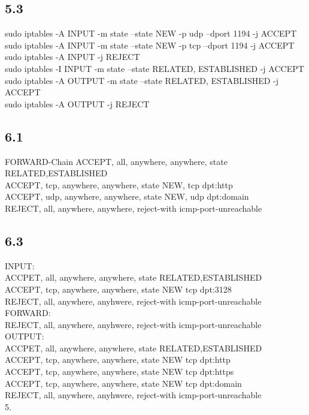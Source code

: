\documentclass[12pt]{article}
\theoremstyle{plain}
\begin{document}
\subsection*{5.3}
sudo iptables -A INPUT -m state --state NEW -p udp --dport 1194 -j ACCEPT\\
sudo iptables -A INPUT -m state --state NEW -p tcp --dport 1194 -j ACCEPT\\
sudo iptables -A INPUT -j REJECT\\
sudo iptables -I INPUT -m state --state RELATED, ESTABLISHED -j ACCEPT\\
sudo iptables -A OUTPUT -m state --state RELATED, ESTABLISHED -j ACCEPT\\
sudo iptables -A OUTPUT -j REJECT\\
\subsection*{6.1}
FORWARD-Chain
ACCEPT, all, anywhere, anywhere, state RELATED,ESTABLISHED\\
ACCEPT, tcp, anywhere, anywhere, state NEW, tcp dpt:http\\
ACCEPT, udp, anywhere, anywhere, state NEW, udp dpt:domain\\
REJECT, all, anywhere, anywhere, reject-with icmp-port-unreachable\\
\subsection*{6.3}
INPUT:\\
ACCPET, all, anywhere, anywhere, state RELATED,ESTABLISHED\\
ACCEPT, tcp, anywhere, anywhere, state NEW tcp dpt:3128\\
REJECT, all, anywhere, anyhwere, reject-with icmp-port-unreachable\\
FORWARD:\\
REJECT, all, anywhere, anyhwere, reject-with icmp-port-unreachable\\
OUTPUT:\\
ACCPET, all, anywhere, anywhere, state RELATED,ESTABLISHED\\
ACCEPT, tcp, anywhere, anywhere, state NEW tcp dpt:http\\
ACCEPT, tcp, anywhere, anywhere, state NEW tcp dpt:https\\
ACCEPT, tcp, anywhere, anywhere, state NEW tcp dpt:domain\\
REJECT, all, anywhere, anyhwere, reject-with icmp-port-unreachable\\
5.\\
\end{document}
